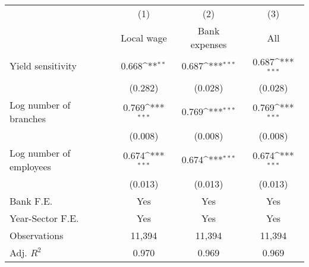 {
\def\sym#1{\ifmmode^{#1}\else\(^{#1}\)\fi}
\begin{tabular*}{\hsize}{@{\hskip\tabcolsep\extracolsep\fill}l*{3}{c}}
\hline\hline
                    &\multicolumn{1}{c}{(1)}&\multicolumn{1}{c}{(2)}&\multicolumn{1}{c}{(3)}\\
                    &\multicolumn{1}{c}{Local wage}&\multicolumn{1}{c}{Bank expenses}&\multicolumn{1}{c}{All}\\
\hline
Yield sensitivity   &       0.668\sym{**} &       0.687\sym{***}&       0.687\sym{***}\\
                    &     (0.282)         &     (0.028)         &     (0.028)         \\
[1em]
Log number of branches&       0.769\sym{***}&       0.769\sym{***}&       0.769\sym{***}\\
                    &     (0.008)         &     (0.008)         &     (0.008)         \\
[1em]
Log number of employees&       0.674\sym{***}&       0.674\sym{***}&       0.674\sym{***}\\
                    &     (0.013)         &     (0.013)         &     (0.013)         \\
\hline
Bank F.E.           &         Yes         &         Yes         &         Yes         \\
Year-Sector F.E.    &         Yes         &         Yes         &         Yes         \\
Observations        &      11,394         &      11,394         &      11,394         \\
Adj. $ R^2$         &       0.970         &       0.969         &       0.969         \\
\hline\hline
\end{tabular*}
}
